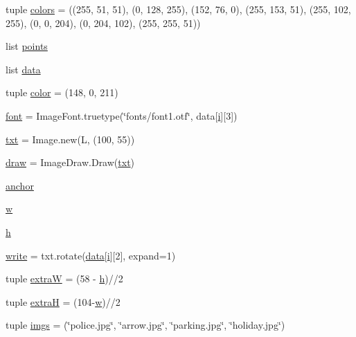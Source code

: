 \begin{DoxyCompactItemize}
tuple \mbox{\hyperlink{namespaceplan_drawing_aaf34615559207ed0d1b747c94b27b5ba}{colors}} = ((255, 51, 51), (0, 128, 255), (152, 76, 0), (255, 153, 51), (255, 102, 255), (0, 0, 204), (0, 204, 102), (255, 255, 51))
\item 
list \mbox{\hyperlink{namespaceplan_drawing_a061361823314d5f75e70a0e9282f34ee}{points}}
\item 
list \mbox{\hyperlink{namespaceplan_drawing_a622e05718ba4ee2b68d34059300226c1}{data}}
\item 
tuple \mbox{\hyperlink{namespaceplan_drawing_a2d58998a47907d9eeb4172cb389143d8}{color}} = (148, 0, 211)
\item 
\mbox{\hyperlink{namespaceplan_drawing_afddf021a6859fba763e2c602b49ad744}{font}} = Image\+Font.\+truetype(\char`\"{}fonts/font1.\+otf\char`\"{}, data\mbox{[}\mbox{\hyperlink{namespaceplan_drawing_a9b507814fb99be9c876ea329f40fc0f1}{i}}\mbox{]}\mbox{[}3\mbox{]})
\item 
\mbox{\hyperlink{namespaceplan_drawing_a6353872188dfcfa8978c7abce9af330f}{txt}} = Image.\+new(\textquotesingle{}L\textquotesingle{}, (100, 55))
\item 
\mbox{\hyperlink{namespaceplan_drawing_ae766d314d267c74a5be2ebb84fffce5c}{draw}} = Image\+Draw.\+Draw(\mbox{\hyperlink{namespaceplan_drawing_a6353872188dfcfa8978c7abce9af330f}{txt}})
\item 
\mbox{\hyperlink{namespaceplan_drawing_a227f71f6f7d861c2ef06f8315e9037a7}{anchor}}
\item 
\mbox{\hyperlink{namespaceplan_drawing_ad7a76c8ceac3b7ee1e99ff482407c1af}{w}}
\item 
\mbox{\hyperlink{namespaceplan_drawing_ae4861d93282ebc625dbbc2f1676f3baf}{h}}
\item 
\mbox{\hyperlink{namespaceplan_drawing_adf3ffc21a30cc208673fb4f39fd77c5a}{write}} = txt.\+rotate(\mbox{\hyperlink{namespaceplan_drawing_a622e05718ba4ee2b68d34059300226c1}{data}}\mbox{[}\mbox{\hyperlink{namespaceplan_drawing_a9b507814fb99be9c876ea329f40fc0f1}{i}}\mbox{]}\mbox{[}2\mbox{]}, expand=1)
\item 
tuple \mbox{\hyperlink{namespaceplan_drawing_adfaadcdef85cf3cd5d7bd077de6f2339}{extraW}} = (58 -\/ \mbox{\hyperlink{namespaceplan_drawing_ae4861d93282ebc625dbbc2f1676f3baf}{h}})//2
\item 
tuple \mbox{\hyperlink{namespaceplan_drawing_af7d5ee628341623ec3f58c89c4c58162}{extraH}} = (104-\/\mbox{\hyperlink{namespaceplan_drawing_ad7a76c8ceac3b7ee1e99ff482407c1af}{w}})//2
\item 
tuple \mbox{\hyperlink{namespaceplan_drawing_a0a2455d5a72f1d606af897f753ad35b6}{imgs}} = (\char`\"{}police.\+jpg\char`\"{}, \char`\"{}arrow.\+jpg\char`\"{}, \char`\"{}parking.\+jpg\char`\"{}, \char`\"{}holiday.\+jpg\char`\"{})

\end{DoxyCompactItemize}
